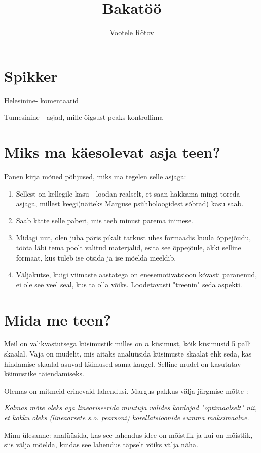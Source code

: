\documentclass{article}
\author{Vootele Rõtov}
\title{Bakatöö}
\begin{document}
\section*{Spikker}

{\color{cyan} Helesinine- komentaarid}

{\color{blue} Tumesinine - asjad, mille õigsust peaks kontrollima}


{\color{cyan}\section*{Miks ma käesolevat asja teen?}

Panen kirja mõned põhjused, miks ma tegelen selle asjaga:
\begin{enumerate}[I]
\item Sellest on kellegile kasu - loodan realselt, et saan hakkama mingi toreda asjaga, millest keegi(näiteks Marguse psühholoogidest sõbrad) kasu saab.
\item Saab kätte selle paberi, mis teeb minust parema inimese. 
\item Midagi uut, olen juba päris pikalt tarkust ühes formaadis kuula õppejõudu, tööta läbi tema poolt valitud materjalid, esita see õppejõule, äkki selline formaat, kus tuleb ise otsida ja ise mõelda meeldib.
\item Väljakutse, kuigi viimaste aastatega on enesemotivatsioon kõvasti paranenud, ei ole see veel seal, kus ta olla võiks. Loodetavasti "treenin" seda aspekti.
\end{enumerate}}

\section*{Mida me teen?}

Meil on valikvastutsega küsimustik milles on $n$ küsimust, kõik küsimusid 5 palli skaalal. Vaja on mudelit, mis aitaks anal\"u\"usida k\"usimuste skaalat ehk seda, kas hindamise skaalal asuvad k\"simused sama kaugel. Selline mudel on kasutatav k\"simustike täiendamiseks. 

Olemas on mitmeid erinevaid lahendusi. Margus pakkus välja järgmise mõtte : 

\textit{Kolmas mõte oleks aga lineariseerida muutuja valides kordajad "optimaalselt" nii, et kokku oleks (lineaarsete s.o. pearsoni) korellatsioonide summa maksimaalne.}

Minu \"ulesanne: analüüsida, kas see lahendus idee on mõistlik ja kui on mõistlik, siis välja mõelda, kuidas see lahendus täpselt võiks välja näha. 
\end{document}
